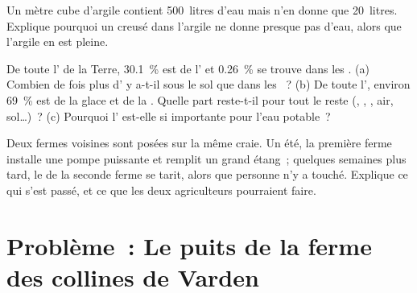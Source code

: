 \begin{exercise}[$\star\star$]\label{exo:g6:water-underground:10}
Un mètre cube d'argile contient 500~litres d'eau mais n'en donne que
20~litres. Explique pourquoi un  creusé dans l'argile ne donne
presque pas d'eau, alors que l'argile en est pleine.
\end{exercise}

\begin{exercise}[$\star\star\star$]\label{exo:g6:water-underground:11}
De toute l' de la Terre, 30.1~\% est de l' et
0.26~\% se trouve dans les . (a) Combien de fois plus d' y
a-t-il sous le sol que dans les ~? (b) De toute l', environ
69~\% est de la glace et de la . Quelle part reste-t-il pour tout le
reste (, , , air, sol\ldots)~? (c) Pourquoi
l' est-elle si importante pour l'eau potable~?
\end{exercise}

\begin{exercise}[$\star\star\star$]\label{exo:g6:water-underground:12}
Deux fermes voisines sont posées sur la même craie. Un été, la première
ferme installe une pompe puissante et remplit un grand étang~; quelques
semaines plus tard, le  de la seconde ferme se tarit, alors que
personne n'y a touché. Explique ce qui s'est passé, et ce que les deux
agriculteurs pourraient faire.
\end{exercise}

\section{Problème~: Le puits de la ferme des collines de Varden}

